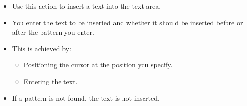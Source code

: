 \begin{itemize}
\item Use this action to insert a text into the text area.
\item You enter the text to be inserted and whether it should be inserted before or after the pattern you enter.
\item This is achieved by:
\begin{itemize}
\item Positioning the cursor at the position you specify.
\item Entering the text.
\end{itemize}
\item If a pattern is not found, the text is not inserted. 
\end{itemize}
